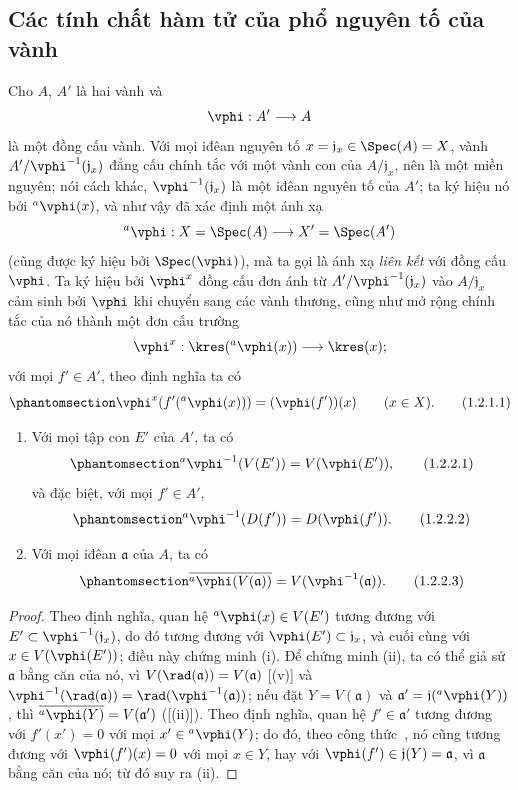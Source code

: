 \documentclass[oneside]{amsart}
\makeatletter
\newcommand{\ega@arrow}[2]{\mathchoice{#1}{#2}{#2}{#2}}
\renewcommand{\to}{\ega@arrow{\longrightarrow}{\rightarrow}}
\let\EGAOriginalLabel\label
\renewcommand{\label}[1]{\phantomsection\EGAOriginalLabel{#1}}
\makeatother
\begin{document}
\subsection{Các tính chất hàm tử của phổ nguyên tố của vành}
\label{subsection:I.1.2}

\begin{env}[1.2.1]
\label{I.1.2.1}
Cho $A$, $A'$ là hai vành và
\[
  \vphi:A'\to A
\]
là một đồng cấu vành.
Với mọi iđêan nguyên tố $x=\mathfrak{j}_x\in\Spec(A)=X$, vành $A'/\vphi^{-1}(\mathfrak{j}_x)$ đẳng cấu chính tắc với một vành con của $A/\mathfrak{j}_x$, nên là một miền nguyên; nói cách khác, $\vphi^{-1}(\mathfrak{j}_x)$ là một iđêan nguyên tố của $A'$;
ta ký hiệu nó bởi ${}^a\vphi(x)$, và như vậy đã xác định một ánh xạ
\[
  {}^a\vphi:X=\Spec(A)\to X'=\Spec(A')
\]
(cũng được ký hiệu bởi $\Spec(\vphi)$), mà ta gọi là ánh xạ \emph{liên kết} với đồng cấu $\vphi$.
Ta ký hiệu bởi $\vphi^x$ đồng cấu đơn ánh từ $A'/\vphi^{-1}(\mathfrak{j}_x)$ vào $A/\mathfrak{j}_x$ cảm sinh bởi $\vphi$ khi chuyển sang các vành thương, cũng như mở rộng chính tắc của nó thành một đơn cấu trường
\[
  \vphi^x:\kres({}^a\vphi(x))\to\kres(x);
\]
với mọi $f'\in A'$, theo định nghĩa ta có
\[
  \label{I.1.2.1.1}
  \vphi^x(f'({}^a\vphi(x)))=(\vphi(f'))(x)\qquad(x\in X).
  \tag{1.2.1.1}
\]
\end{env}

\begin{proposition}[1.2.2]
\label{I.1.2.2}
\medskip\noindent
\begin{enumerate}
  \item[{\rm(i)}] Với mọi tập con $E'$ của $A'$, ta có
    \[
    \label{I.1.2.2.1}
      {}^a\vphi^{-1}(V(E'))=V(\vphi(E')),
      \tag{1.2.2.1}
    \]
    và đặc biệt, với mọi $f'\in A'$,
    \[
    \label{I.1.2.2.2}
      {}^a\vphi^{-1}(D(f'))=D(\vphi(f')).
      \tag{1.2.2.2}
    \]
  \item[{\rm(ii)}] Với mọi iđêan $\mathfrak{a}$ của $A$, ta có
    \[
    \label{I.1.2.2.3}
      \overline{{}^a\vphi(V(\mathfrak{a}))}=V(\vphi^{-1}(\mathfrak{a})).
      \tag{1.2.2.3}
    \]
\end{enumerate}
\end{proposition}

\begin{proof}
Theo định nghĩa, quan hệ ${}^a\vphi(x)\in V(E')$ tương đương với $E'\subset\vphi^{-1}(\mathfrak{j}_x)$, do đó tương đương với $\vphi(E')\subset\mathfrak{j}_x$, và cuối cùng với $x\in V(\vphi(E'))$; điều này chứng minh (i).
Để chứng minh (ii), ta có thể giả sử $\mathfrak{a}$ bằng căn của nó, vì $V(\rad(\mathfrak{a}))=V(\mathfrak{a})$ [(v)] và $\vphi^{-1}(\rad(\mathfrak{a}))=\rad(\vphi^{-1}(\mathfrak{a}))$;
nếu đặt $Y=V(\mathfrak{a})$ và $\mathfrak{a}'=\mathfrak{j}({}^a\vphi(Y))$, thì $\overline{{}^a\vphi(Y)}=V(\mathfrak{a}')$ ([(ii)]).
Theo định nghĩa, quan hệ $f'\in\mathfrak{a}'$ tương đương với $f'(x')=0$ với mọi $x'\in{}^a\vphi(Y)$; do đó, theo công thức~, nó cũng tương đương với $\vphi(f')(x)=0$ với mọi $x\in Y$, hay với $\vphi(f')\in\mathfrak{j}(Y)=\mathfrak{a}$, vì $\mathfrak{a}$ bằng căn của nó;
từ đó suy ra (ii).
\end{proof}
\end{document}
